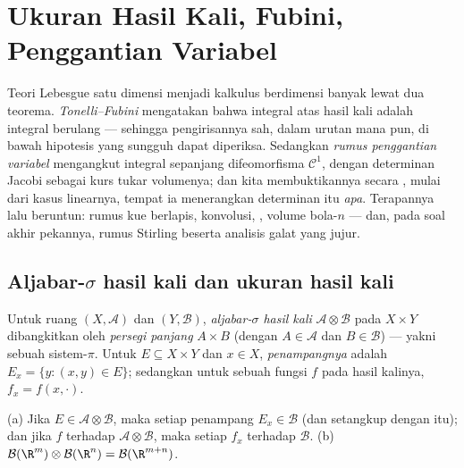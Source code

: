 \chapter{Ukuran Hasil Kali, Fubini, Penggantian Variabel}
\label{ch:b3:product}

Teori Lebesgue satu dimensi menjadi kalkulus berdimensi banyak
lewat dua teorema. \emph{Tonelli--Fubini} mengatakan bahwa
integral atas hasil kali adalah integral berulang --- sehingga pengirisannya
sah, dalam urutan mana pun, di bawah hipotesis yang sungguh dapat
diperiksa. Sedangkan \emph{rumus penggantian variabel} mengangkut
integral sepanjang difeomorfisma $\mathcal C^1$, dengan
determinan Jacobi sebagai kurs tukar volumenya; dan kita membuktikannya
secara , mulai dari kasus linearnya, tempat ia menerangkan
determinan itu \emph{apa}. Terapannya lalu beruntun: rumus kue
berlapis, konvolusi, , volume
bola-$n$ --- dan, pada soal akhir pekannya, rumus Stirling
beserta analisis galat yang jujur.

\section{Aljabar-$\sigma$ hasil kali dan ukuran hasil kali}

\begin{definition}\label{def:b3:product:sigma}
Untuk ruang  $(X, \mathcal A)$ dan $(Y, \mathcal B)$,
\emph{aljabar-$\sigma$ hasil kali} $\mathcal A \otimes \mathcal B$ pada $X \times
Y$ dibangkitkan oleh \emph{persegi panjang} $A \times B$ (dengan $A \in
\mathcal A$ dan $B \in \mathcal B$) --- yakni sebuah sistem-$\pi$. Untuk $E
\subseteq X\times Y$ dan $x \in X$, \emph{penampangnya} adalah $E_x
= \{y : (x,y) \in E\}$; sedangkan untuk sebuah fungsi $f$ pada hasil kalinya,
$f_x = f(x, \cdot)$.
\end{definition}

\begin{proposition}\label{prop:b3:product:sections}
(a) Jika $E \in \mathcal A\otimes\mathcal B$, maka setiap penampang $E_x
\in \mathcal B$ (dan setangkup dengan itu); dan jika $f$  terhadap $\mathcal
A\otimes\mathcal B$, maka setiap $f_x$  terhadap $\mathcal
B$.
(b) $\mathcal B(\R^m)\otimes\mathcal B(\R^n) = \mathcal
B(\R^{m+n})$.
\end{proposition}

